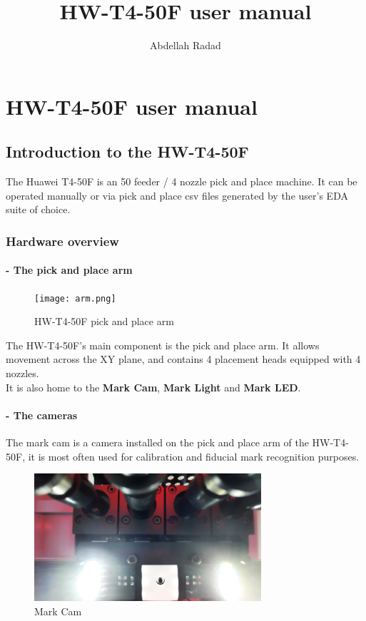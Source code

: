 \documentclass[a4paper,10pt]{report}
\title{HW-T4-50F user manual}
\author{Abdellah Radad}
\begin{document}

\newpage
\tableofcontents
\newpage
\listoffigures
\newpage
\chapter{HW-T4-50F user manual}
\newpage
\section{Introduction to the HW-T4-50F}
The Huawei T4-50F is an 50 feeder / 4 nozzle pick and place machine. It can be operated manually or via pick and place csv files generated by the user's EDA suite of choice.\\
\subsection{Hardware overview}
\subsubsection{- The pick and place arm}
\begin{figure}[!htb]
 \centering
 \texttt{[image: arm.png]}
 \caption{HW-T4-50F pick and place arm}
\end{figure}
The HW-T4-50F's main component is the pick and place arm. It allows movement across the XY plane, and contains 4 placement heads equipped with 4 nozzles.\\
It is also home to the \textbf{Mark Cam}, \textbf{Mark Light} and \textbf{Mark LED}.
\newpage
\subsubsection{- The cameras}
The mark cam is a camera installed on the pick and place arm of the HW-T4-50F, it is most often used for calibration and fiducial mark recognition purposes.\\
\begin{figure}[!htb]
 \centering
 \includegraphics[width=0.75\textwidth]{mcam.jpg}
 \caption{Mark Cam}
\end{figure}
\end{document}
